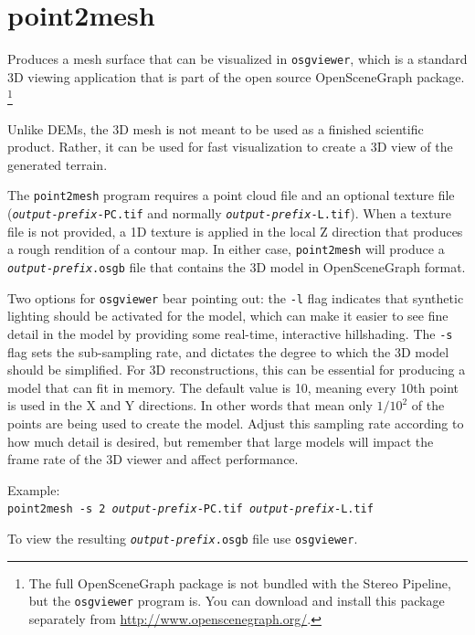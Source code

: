 \section{point2mesh}
\label{point2mesh}

Produces a mesh surface that can be visualized in {\tt osgviewer},
which is a standard 3D viewing application that is part of the open
source OpenSceneGraph package.  \footnote{The full OpenSceneGraph package
is not bundled with the Stereo Pipeline, but the \texttt{osgviewer} program
is.  You can download and install this package separately from
\url{http://www.openscenegraph.org/}.}

Unlike \acp{DEM}, the 3D mesh is not meant to be used as a finished
scientific product.  Rather, it can be used for fast visualization
to create a 3D view of the generated terrain.

The \texttt{point2mesh} program requires a point cloud file and an
optional texture file (\texttt{\textit{output-prefix}-PC.tif} and
normally \texttt{\textit{output-prefix}-L.tif}). When a texture
file is not provided, a 1D texture is applied in the local Z direction
that produces a rough rendition of a contour map.  In either case,
\texttt{point2mesh} will produce a \texttt{\textit{output-prefix}.osgb}
file that contains the 3D model in OpenSceneGraph format.

Two options for \texttt{osgviewer} bear pointing out: the \texttt{-l}
flag indicates that synthetic lighting should be activated for the
model, which can make it easier to see fine detail in the model by
providing some real-time, interactive hillshading.  The \verb#-s#
flag sets the sub-sampling rate, and dictates the degree to which
the 3D model should be simplified.  For 3D reconstructions, this
can be essential for producing a model that can fit in memory.  The
default value is 10, meaning every 10th point is used in the X and
Y directions. In other words that mean only $1/10^2$ of the points
are being used to create the model. Adjust this sampling rate
according to how much detail is desired, but remember that large
models will impact the frame rate of the 3D viewer and affect
performance.

Example:\\
\hspace*{2em}\texttt{point2mesh -s 2 \textit{output-prefix}-PC.tif \textit{output-prefix}-L.tif}

To view the resulting \texttt{\textit{output-prefix}.osgb} file use
\texttt{osgviewer}.

